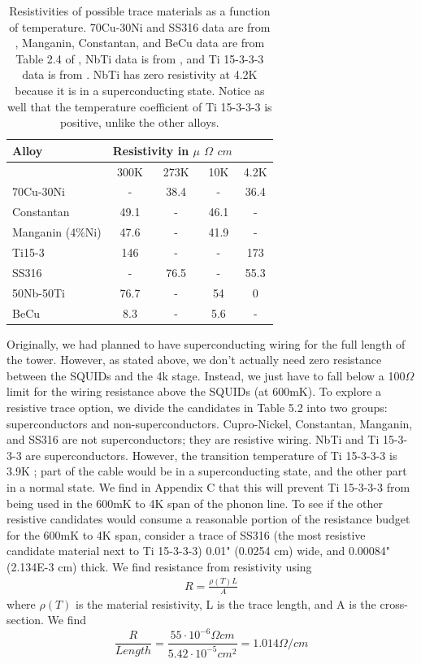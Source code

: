 \documentclass{report}
\begin{document}
\begin{table}[h]
\centering
\begin{threeparttable}
\begin{tabular}{l|c|c|c|c}
Alloy & \multicolumn{3}{c}{Resistivity in $\mu$ $\Omega$ $cm$} \\\toprule
 & 300K & 273K & 10K & 4.2K \\\midrule
70Cu-30Ni & - & 38.4 & - & 36.4 \\
Constantan & 49.1 & - & 46.1 & - \\
Manganin (4\%Ni) & 47.6 & - & 41.9 & - \\
Ti15-3 & 146 & - & - & 173 \\
SS316 & - & 76.5 & - & 55.3 \\
50Nb-50Ti & 76.7 & - & 54 & 0 \\
BeCu & 8.3 & - & 5.6 & - \\
\end{tabular}
\end{threeparttable}
\caption{Resistivities of possible trace materials as a function of temperature. 70Cu-30Ni and SS316 data are from \cite{Clark1970}, Manganin, Constantan, and BeCu data are from Table 2.4 of \cite{Sciver1986}, NbTi data is from \cite{byc}, and Ti 15-3-3-3 data is from \cite{wik}. NbTi has zero resistivity at 4.2K because it is in a superconducting state. Notice as well that the temperature coefficient of Ti 15-3-3-3 is positive, unlike the other alloys.}
\end{table}

Originally, we had planned to have superconducting wiring for the full length of the tower. However, as stated above, we don't actually need zero resistance between the SQUIDs and the 4k stage. Instead, we just have to fall below a 100$\Omega$ limit for the wiring resistance above the SQUIDs (at 600mK). To explore a resistive trace option, we divide the candidates in Table 5.2 into two groups: superconductors and non-superconductors. Cupro-Nickel, Constantan, Manganin, and SS316 are not superconductors; they are resistive wiring. NbTi and Ti 15-3-3-3 are superconductors. However, the transition temperature of Ti 15-3-3-3 is 3.9K \cite{wik}; part of the cable would be in a superconducting state, and the other part in a normal state. We find in Appendix C that this will prevent Ti 15-3-3-3 from being used in the 600mK to 4K span of the phonon line. To see if the other resistive candidates would consume a reasonable portion of the resistance budget for the 600mK to 4K span, consider a trace of SS316 (the most resistive candidate material next to Ti 15-3-3-3) 0.01" (0.0254 cm) wide, and 0.00084" (2.134E-3 cm) thick. We find resistance from resistivity using
\begin{eqnarray}
R = \frac{\rho(T) L}{A}
\end{eqnarray}
where $\rho(T)$ is the material resistivity, L is the trace length, and A is the cross-section. We find
$$
\frac{R}{Length} = \frac{55 \cdot 10^{-6} \Omega cm}{5.42 \cdot 10^{-5} cm^{2}} = 1.014 \Omega / cm
$$
\end{document}
